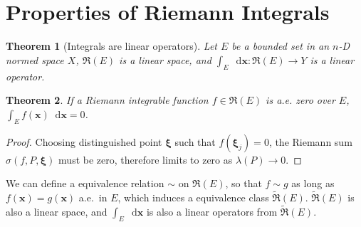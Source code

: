 \documentclass[openany]{book}
\theoremstyle{plain}
\newtheorem{theorem}{Theorem}[section] %
\theoremstyle{definition}
\newcommand{\dif}{\mathop{}\!\mathrm{d}} %
\newcommand*{\bv}{\boldsymbol} %
\begin{document}
\section{Properties of Riemann Integrals}

\begin{theorem}[Integrals are linear operators]
		\label{theorem: integrals are linear operators}
	Let $E$ be a bounded set in an $n$-D normed space $X$, $\mathfrak R(E)$ is a linear space, and $\int_E \dif \bv x \colon \mathfrak R(E) \to Y$ is a linear operator.
\end{theorem}

\begin{theorem}
	\label{theorem: integral is zero if a.e. zero}
	If a Riemann integrable function $f \in \mathfrak R(E)$ is a.e. zero over $E$, $\int_E f(\bv x) \dif \bv x = 0$.
\end{theorem}
\begin{proof}
	Choosing distinguished point $\bv \xi$ such that $f(\bv \xi_j) = 0$, the Riemann sum $\sigma(f, P, \bv \xi)$ must be zero, therefore limits to zero as $\lambda(P) \to 0$.
\end{proof}

We can define a equivalence relation $\sim$ on $\mathfrak R(E)$, so that $f \sim g$ as long as $f(\bv x) = g(\bv x)$ a.e.\ in $E$, which induces a equivalence class $\tilde{\mathfrak R}(E)$. 
$\tilde{\mathfrak R}(E)$ is also a linear space, and $\int_E \dif \bv x$ is also a linear operators from $\tilde{\mathfrak R}(E)$.
\end{document}

